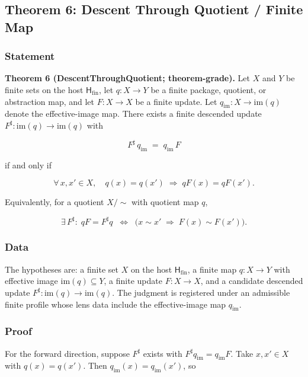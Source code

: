\documentclass[11pt]{article}
\theoremstyle{definition}
\begin{document}
\subsection{Theorem 6: Descent Through Quotient / Finite Map}

\subsubsection{Statement}

\textbf{Theorem 6 (DescentThroughQuotient; theorem-grade).} Let \(X\) and \(Y\) be finite sets on the host \(\mathsf H_{\mathrm{fin}}\), let \(q:X\to Y\) be a finite package, quotient, or abstraction map, and let \(F:X\to X\) be a finite update. Let \(q_{\mathrm{im}}:X\to\mathrm{im}(q)\) denote the effective-image map. There exists a finite descended update \(F^\sharp:\mathrm{im}(q)\to\mathrm{im}(q)\) with

\[
F^\sharp\,q_{\mathrm{im}}\;=\;q_{\mathrm{im}}\,F
\]

if and only if

\[
\forall\,x,x'\in X,\quad q(x)=q(x')\;\Longrightarrow\;qF(x)=qF(x').
\]

Equivalently, for a quotient \(X/\!\sim\) with quotient map \(q\),

\[
\exists\,F^\sharp\colon\;qF=F^\sharp q\;\;\Longleftrightarrow\;\;\bigl(x\sim x'\;\Longrightarrow\;F(x)\sim F(x')\bigr).
\]

\subsubsection{Data}

The hypotheses are: a finite set \(X\) on the host \(\mathsf H_{\mathrm{fin}}\), a finite map \(q:X\to Y\) with effective image \(\mathrm{im}(q)\subseteq Y\), a finite update \(F:X\to X\), and a candidate descended update \(F^\sharp:\mathrm{im}(q)\to\mathrm{im}(q)\). The judgment is registered under an admissible finite profile whose lens data include the effective-image map \(q_{\mathrm{im}}\).

\subsubsection{Proof}

For the forward direction, suppose \(F^\sharp\) exists with \(F^\sharp q_{\mathrm{im}}=q_{\mathrm{im}}F\). Take \(x,x'\in X\) with \(q(x)=q(x')\). Then \(q_{\mathrm{im}}(x)=q_{\mathrm{im}}(x')\), so
\end{document}
